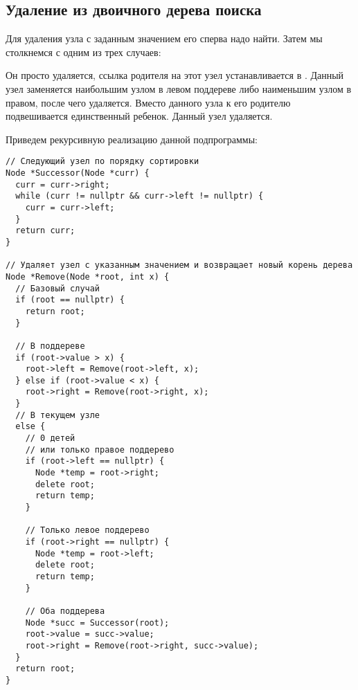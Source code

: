 \subsection{Удаление из двоичного дерева поиска}

Для удаления узла с заданным значением его сперва надо найти. Затем мы столкнемся с одним из трех случаев:
\begin{enumerate}
   Он просто удаляется, ссылка родителя на этот узел устанавливается в .
   Данный узел заменяется наибольшим узлом в левом поддереве либо наименьшим узлом в правом, после чего удаляется.
   Вместо данного узла к его родителю подвешивается единственный ребенок. Данный узел удаляется.
\end{enumerate}

Приведем рекурсивную реализацию данной подпрограммы:
\begin{verbatim}
// Следующий узел по порядку сортировки
Node *Successor(Node *curr) {
  curr = curr->right;
  while (curr != nullptr && curr->left != nullptr) {
    curr = curr->left;
  }
  return curr;
}

// Удаляет узел с указанным значением и возвращает новый корень дерева
Node *Remove(Node *root, int x) {
  // Базовый случай
  if (root == nullptr) {
    return root;
  }

  // В поддереве
  if (root->value > x) {
    root->left = Remove(root->left, x);
  } else if (root->value < x) {
    root->right = Remove(root->right, x);
  }
  // В текущем узле
  else {
    // 0 детей
    // или только правое поддерево
    if (root->left == nullptr) {
      Node *temp = root->right;
      delete root;
      return temp;
    }

    // Только левое поддерево
    if (root->right == nullptr) {
      Node *temp = root->left;
      delete root;
      return temp;
    }

    // Оба поддерева
    Node *succ = Successor(root);
    root->value = succ->value;
    root->right = Remove(root->right, succ->value);
  }
  return root;
}
\end{verbatim}